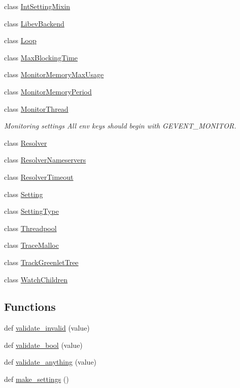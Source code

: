 \begin{DoxyCompactItemize}
\item 
class \hyperlink{classgevent_1_1__config_1_1_int_setting_mixin}{Int\+Setting\+Mixin}
\item 
class \hyperlink{classgevent_1_1__config_1_1_libev_backend}{Libev\+Backend}
\item 
class \hyperlink{classgevent_1_1__config_1_1_loop}{Loop}
\item 
class \hyperlink{classgevent_1_1__config_1_1_max_blocking_time}{Max\+Blocking\+Time}
\item 
class \hyperlink{classgevent_1_1__config_1_1_monitor_memory_max_usage}{Monitor\+Memory\+Max\+Usage}
\item 
class \hyperlink{classgevent_1_1__config_1_1_monitor_memory_period}{Monitor\+Memory\+Period}
\item 
class \hyperlink{classgevent_1_1__config_1_1_monitor_thread}{Monitor\+Thread}
\begin{DoxyCompactList}\small\item\em Monitoring settings All env keys should begin with G\+E\+V\+E\+N\+T\+\_\+\+M\+O\+N\+I\+T\+OR. \end{DoxyCompactList}\item 
class \hyperlink{classgevent_1_1__config_1_1_resolver}{Resolver}
\item 
class \hyperlink{classgevent_1_1__config_1_1_resolver_nameservers}{Resolver\+Nameservers}
\item 
class \hyperlink{classgevent_1_1__config_1_1_resolver_timeout}{Resolver\+Timeout}
\item 
class \hyperlink{classgevent_1_1__config_1_1_setting}{Setting}
\item 
class \hyperlink{classgevent_1_1__config_1_1_setting_type}{Setting\+Type}
\item 
class \hyperlink{classgevent_1_1__config_1_1_threadpool}{Threadpool}
\item 
class \hyperlink{classgevent_1_1__config_1_1_trace_malloc}{Trace\+Malloc}
\item 
class \hyperlink{classgevent_1_1__config_1_1_track_greenlet_tree}{Track\+Greenlet\+Tree}
\item 
class \hyperlink{classgevent_1_1__config_1_1_watch_children}{Watch\+Children}
\end{DoxyCompactItemize}
\subsection*{Functions}
\begin{DoxyCompactItemize}
\item 
def \hyperlink{namespacegevent_1_1__config_aa9582466c42175e3f56973a1ee5998da}{validate\+\_\+invalid} (value)
\item 
def \hyperlink{namespacegevent_1_1__config_a4c6aaec72970a8735546a459131ad32c}{validate\+\_\+bool} (value)
\item 
def \hyperlink{namespacegevent_1_1__config_a6588800a66294e87809274c9ed90bb21}{validate\+\_\+anything} (value)
\item 
def \hyperlink{namespacegevent_1_1__config_a11c303bdbf900089c0633d237a63d211}{make\+\_\+settings} ()
\end{DoxyCompactItemize}
